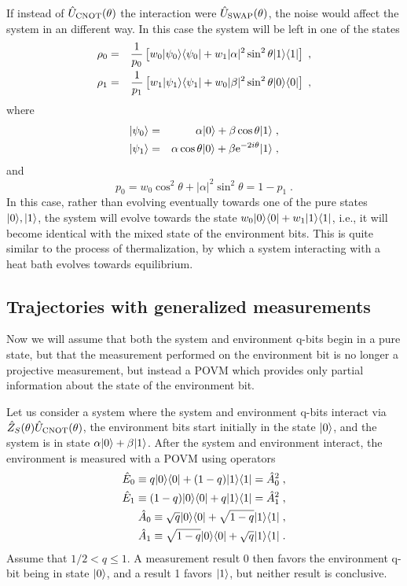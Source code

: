 If instead of ${\hat U}_{\rm CNOT}(\theta)$ the interaction were
${\hat U}_{\rm SWAP}(\theta)$, the noise would affect the system in an
different way.  In this case the system will be left in one of the
states
\begin{eqnarray}
\rho_0 &=& {1\over p_0}\left[ w_0 {| \psi_0 \rangle}{\langle \psi_0 |}
  + w_1 |\alpha|^2\sin^2\theta {| 1 \rangle}{\langle 1 |} \right] \;, \nonumber\\
\rho_1 &=& {1\over p_1}\left[ w_1 {| \psi_1 \rangle}{\langle \psi_1 |}
  + w_0 |\beta|^2\sin^2\theta {| 0 \rangle}{\langle 0 |} \right] \;,
\end{eqnarray}
where
\begin{eqnarray}
{| \psi_0 \rangle} &=& \alpha{| 0 \rangle}
  + \beta\cos\theta{| 1 \rangle} \;, \nonumber\\
{| \psi_1 \rangle} &=& \alpha\cos\theta{| 0 \rangle}
  + \beta{\rm e}^{-2i\theta}{| 1 \rangle} \;,
\end{eqnarray}
and
\begin{equation}
p_0 = w_0 \cos^2\theta + |\alpha|^2\sin^2\theta = 1 - p_1 \;.
\end{equation}
In this case, rather than evolving eventually towards one of the pure
states ${| 0 \rangle},{| 1 \rangle}$, the system will evolve towards the state
$w_0 {| 0 \rangle}{\langle 0 |} + w_1{| 1 \rangle}{\langle 1 |}$, i.e., it will become identical with
the mixed state of the environment bits.  This is quite similar to the
process of thermalization, by which a system interacting with a heat
bath evolves towards equilibrium.


\subsection{Trajectories with generalized measurements}

Now we will assume that both the system and environment q-bits begin
in a pure state, but that the measurement performed on the environment
bit is no longer a projective measurement, but instead a POVM which
provides only partial information about the state of the environment bit.

Let us consider a system where the system and environment q-bits interact
via ${\hat Z}_S(\theta){\hat U}_{\rm CNOT}(\theta)$, the environment bits start initially
in the state ${| 0 \rangle}$, and the system is in state $\alpha{| 0 \rangle}+\beta{| 1 \rangle}$.
After the system and environment interact, the environment is measured
with a POVM using operators
\begin{eqnarray}
{\hat E}_0 \equiv q {| 0 \rangle}{\langle 0 |} + (1-q) {| 1 \rangle}{\langle 1 |} = {\hat A}_0^2 \;, \nonumber\\
{\hat E}_1 \equiv (1-q) {| 0 \rangle}{\langle 0 |} + q {| 1 \rangle}{\langle 1 |} = {\hat A}_1^2 \;, \nonumber\\
{\hat A}_0 \equiv \sqrt{q} {| 0 \rangle}{\langle 0 |} + \sqrt{1-q} {| 1 \rangle}{\langle 1 |} \;, \nonumber\\
{\hat A}_1 \equiv \sqrt{1-q} {| 0 \rangle}{\langle 0 |} + \sqrt{q} {| 1 \rangle}{\langle 1 |} \;.
\end{eqnarray}
Assume that $1/2 < q \le 1$.  A measurement result 0 then favors the
environment q-bit being in state ${| 0 \rangle}$, and a result 1 favors ${| 1 \rangle}$,
but neither result is conclusive.

